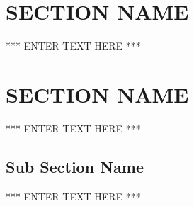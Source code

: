 
\newpage

\section{SECTION NAME}
*** ENTER TEXT HERE ***

\newpage

\section{SECTION NAME}
*** ENTER TEXT HERE ***

\subsection{Sub Section Name}
*** ENTER TEXT HERE ***
